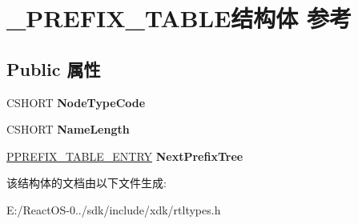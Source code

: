 \hypertarget{struct___p_r_e_f_i_x___t_a_b_l_e}{}\section{\+\_\+\+P\+R\+E\+F\+I\+X\+\_\+\+T\+A\+B\+L\+E结构体 参考}
\label{struct___p_r_e_f_i_x___t_a_b_l_e}
\subsection*{Public 属性}
\begin{DoxyCompactItemize}
\item 
\mbox{\label{struct___p_r_e_f_i_x___t_a_b_l_e_aa50be6f411da5070045b1d4367a8b53c}} 
C\+S\+H\+O\+RT {\bfseries Node\+Type\+Code}
\item 
\mbox{\label{struct___p_r_e_f_i_x___t_a_b_l_e_ae6e84e2af4d76627724532d8907f6969}} 
C\+S\+H\+O\+RT {\bfseries Name\+Length}
\item 
\mbox{\label{struct___p_r_e_f_i_x___t_a_b_l_e_a4834ac04a2fcba22ba76c53ec0da9176}} 
\hyperlink{struct___p_r_e_f_i_x___t_a_b_l_e___e_n_t_r_y}{P\+P\+R\+E\+F\+I\+X\+\_\+\+T\+A\+B\+L\+E\+\_\+\+E\+N\+T\+RY} {\bfseries Next\+Prefix\+Tree}
\end{DoxyCompactItemize}


该结构体的文档由以下文件生成\+:\begin{DoxyCompactItemize}
\item 
E\+:/\+React\+O\+S-\/0../sdk/include/xdk/rtltypes.\+h\end{DoxyCompactItemize}

